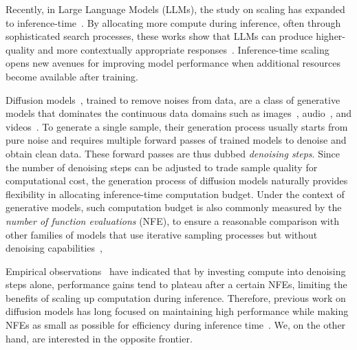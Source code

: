 Recently, in Large Language Models (LLMs), the study on scaling has expanded to inference-time~\citep{snell2024scaling, brown2024large, wu2024empirical}. By allocating more compute during inference, often through sophisticated search processes, these works show that LLMs can produce higher-quality and more contextually appropriate responses~\citep{wei2022chain, wang2022self, yao2024tree, gandhi2024stream, su2024dualformer}. Inference-time scaling opens new avenues for improving model performance when additional resources become available after training.


Diffusion models~\citep{sohl2015deep, ho2020denoising, song2021scorebased}, trained to remove noises from data, are a class of generative models that dominates the continuous data domains such as images~\citep{esser2024scaling}, audio~\citep{schneider2023archisound}, and videos~\citep{polyak2024movie}. 
%
To generate a single sample, their generation process usually starts from pure noise and requires multiple forward passes of trained models to denoise and obtain clean data. These forward passes are thus dubbed \textit{denoising steps}.
%
Since the number of denoising steps can be adjusted to trade sample quality for computational cost, the generation process of diffusion models naturally provides flexibility in allocating inference-time computation budget. Under the context of generative models, such computation budget is also commonly measured by the \textit{number of function evaluations} (NFE), to ensure a reasonable comparison with other families of models that use iterative sampling processes but without denoising capabilities~\citep{tian2024var, yu2024magvit}, 


Empirical observations~\citep{song2021scorebased, karras2022elucidating, song2021denoising} have indicated that by investing compute into denoising steps alone,  performance gains tend to plateau after a certain NFEs, limiting the benefits of scaling up computation during inference.  Therefore, previous work on diffusion models has long focused on maintaining high performance while making NFEs as small as possible for efficiency during inference time~\citep{salimans2022progressive, song2023consistency}. We, on the other hand, are interested in the opposite frontier.


